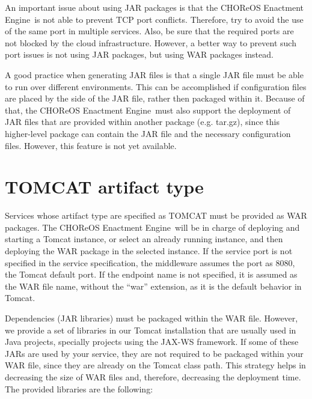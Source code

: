 \documentclass[a4paper, 10pt]{article}
\newcommand{\ee}{CHOReOS Enactment Engine}
\begin{document}
An important issue about using JAR packages is that the \ee\ is not able to prevent TCP port conflicts. Therefore, try to avoid the use of the same port in multiple services. Also, be sure that the required ports are not blocked by the cloud infrastructure. However, a better way to prevent such port issues is not using JAR packages, but using WAR packages instead.

A good practice when generating JAR files is that a single JAR file must be able to run over different environments. This can be accomplished if configuration files are placed by the side of the JAR file, rather then packaged within it. Because of that, the \ee\ must also support the deployment of JAR files that are provided within another package (e.g. tar.gz), since this higher-level package can contain the JAR file and the necessary configuration files. However, this feature is not yet available.

\section{TOMCAT artifact type}

Services whose artifact type are specified as TOMCAT must be provided as WAR packages. The \ee\ will be in charge of deploying and starting a Tomcat instance, or select an already running instance, and then deploying the WAR package in the selected instance. If the service port is not specified in the service specification, the middleware assumes the port as 8080, the Tomcat default port. If the endpoint name is not specified, it is assumed as the WAR file name, without the ``war'' extension, as it is the default behavior in Tomcat.  

Dependencies (JAR libraries) must be packaged within the WAR file. However, we provide a set of libraries in our Tomcat installation that are usually used in Java projects, specially projects using the JAX-WS framework. If some of these JARs are used by your service, they are not required to be packaged within your WAR file, since they are already on the Tomcat class path. This strategy helps in decreasing the size of WAR files and, therefore, decreasing the deployment time. The provided libraries are the following:
\end{document}
